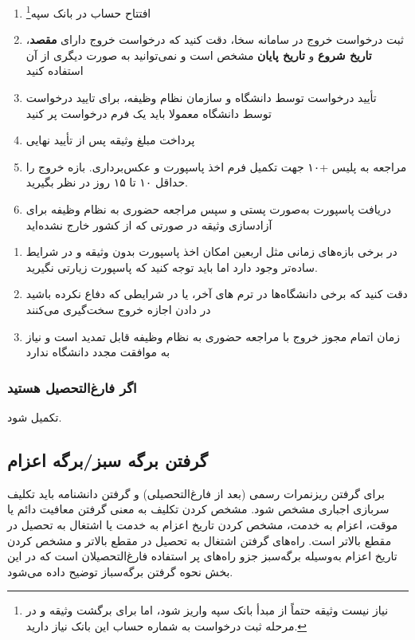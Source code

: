 \begin{enumerate}[leftmargin=.5in]
    \item افتتاح حساب در بانک سپه\footnote{نیاز نیست وثیقه حتماً از مبدأ بانک سپه واریز شود، اما برای برگشت وثیقه و در مرحله ثبت درخواست به شماره حساب این بانک نیاز دارید.}
    
    \item ثبت درخواست خروج در سامانه سخا، دقت کنید که درخواست خروج دارای \textbf{مقصد}، \textbf{تاریخ شروع} و \textbf{تاریخ پایان} مشخص است و نمی‌توانید به صورت دیگری از آن استفاده کنید
    
    \item تأیید درخواست توسط دانشگاه و سازمان نظام وظیفه، برای تایید درخواست توسط دانشگاه معمولا باید یک فرم درخواست پر کنید
    
    \item پرداخت مبلغ وثیقه پس از تأیید نهایی
    
    \item مراجعه به پلیس +۱۰ جهت تکمیل فرم اخذ پاسپورت و عکس‌برداری. بازه خروج را حداقل ۱۰ تا ۱۵ روز در نظر بگیرید.
    
    \item دریافت پاسپورت به‌صورت پستی و سپس مراجعه حضوری به نظام وظیفه برای آزادسازی وثیقه در صورتی که از کشور خارج نشده‌اید
\end{enumerate}


\begin{tipbox}
    \begin{enumerate}
        \item در برخی بازه‌های زمانی مثل اربعین امکان اخذ پاسپورت بدون وثیقه و در شرایط ساده‌تر وجود دارد اما باید توجه کنید که پاسپورت زیارتی نگیرید.
        \item دقت کنید که برخی دانشگاه‌ها در ترم های آخر، یا در شرایطی که دفاع نکرده باشید در دادن اجازه خروج سخت‌گیری می‌کنند
        \item زمان اتمام مجوز خروج با مراجعه حضوری به نظام وظیفه قابل تمدید است و نیاز به موافقت مجدد دانشگاه ندارد
    \end{enumerate}
\end{tipbox}

\subsubsection{اگر فارغ‌التحصیل هستید}
تکمیل شود.


\subsection{گرفتن برگه سبز/برگه اعزام}
برای گرفتن ریزنمرات رسمی (بعد از فارغ‌التحصیلی) و گرفتن دانشنامه باید تکلیف سربازی اجباری مشخص شود. مشخص کردن تکلیف به معنی گرفتن معافیت دائم یا 
موقت، اعزام به خدمت، مشخص کردن تاریخ اعزام به خدمت یا اشتغال به تحصیل در مقطع بالاتر است. راه‌های گرفتن اشتغال به تحصیل در مقطع بالاتر و مشخص کردن تاریخ
اعزام به‌وسیله برگه‌سبز جزو راه‌های پر استفاده فارغ‌التحصیلان است که در این بخش نحوه گرفتن برگه‌سباز توضیح داده می‌شود.

